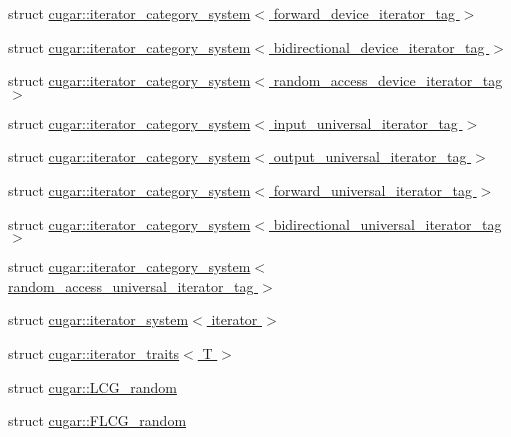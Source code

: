 \begin{DoxyCompactItemize}
\item 
struct \hyperlink{structcugar_1_1iterator__category__system_3_01forward__device__iterator__tag_01_4}{cugar\+::iterator\+\_\+category\+\_\+system$<$ forward\+\_\+device\+\_\+iterator\+\_\+tag $>$}
\item 
struct \hyperlink{structcugar_1_1iterator__category__system_3_01bidirectional__device__iterator__tag_01_4}{cugar\+::iterator\+\_\+category\+\_\+system$<$ bidirectional\+\_\+device\+\_\+iterator\+\_\+tag $>$}
\item 
struct \hyperlink{structcugar_1_1iterator__category__system_3_01random__access__device__iterator__tag_01_4}{cugar\+::iterator\+\_\+category\+\_\+system$<$ random\+\_\+access\+\_\+device\+\_\+iterator\+\_\+tag $>$}
\item 
struct \hyperlink{structcugar_1_1iterator__category__system_3_01input__universal__iterator__tag_01_4}{cugar\+::iterator\+\_\+category\+\_\+system$<$ input\+\_\+universal\+\_\+iterator\+\_\+tag $>$}
\item 
struct \hyperlink{structcugar_1_1iterator__category__system_3_01output__universal__iterator__tag_01_4}{cugar\+::iterator\+\_\+category\+\_\+system$<$ output\+\_\+universal\+\_\+iterator\+\_\+tag $>$}
\item 
struct \hyperlink{structcugar_1_1iterator__category__system_3_01forward__universal__iterator__tag_01_4}{cugar\+::iterator\+\_\+category\+\_\+system$<$ forward\+\_\+universal\+\_\+iterator\+\_\+tag $>$}
\item 
struct \hyperlink{structcugar_1_1iterator__category__system_3_01bidirectional__universal__iterator__tag_01_4}{cugar\+::iterator\+\_\+category\+\_\+system$<$ bidirectional\+\_\+universal\+\_\+iterator\+\_\+tag $>$}
\item 
struct \hyperlink{structcugar_1_1iterator__category__system_3_01random__access__universal__iterator__tag_01_4}{cugar\+::iterator\+\_\+category\+\_\+system$<$ random\+\_\+access\+\_\+universal\+\_\+iterator\+\_\+tag $>$}
\item 
struct \hyperlink{structcugar_1_1iterator__system}{cugar\+::iterator\+\_\+system$<$ iterator $>$}
\item 
struct \hyperlink{structcugar_1_1iterator__traits}{cugar\+::iterator\+\_\+traits$<$ T $>$}
\item 
struct \hyperlink{structcugar_1_1_l_c_g__random}{cugar\+::\+L\+C\+G\+\_\+random}
\item 
struct \hyperlink{structcugar_1_1_f_l_c_g__random}{cugar\+::\+F\+L\+C\+G\+\_\+random}
\item 

\end{DoxyCompactItemize}
